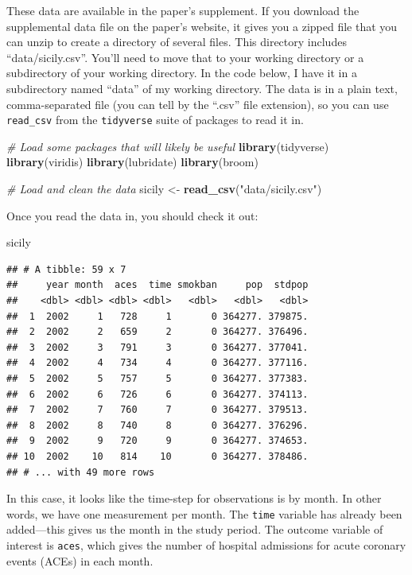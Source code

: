 \documentclass[
]{book}
\newenvironment{Shaded}{\begin{snugshade}}{\end{snugshade}}
\newcommand{\CommentTok}[1]{\textcolor[rgb]{0.56,0.35,0.01}{\textit{#1}}}
\newcommand{\KeywordTok}[1]{\textcolor[rgb]{0.13,0.29,0.53}{\textbf{#1}}}
\newcommand{\NormalTok}[1]{#1}
\newcommand{\StringTok}[1]{\textcolor[rgb]{0.31,0.60,0.02}{#1}}
\begin{document}
These data are available in the paper's supplement. If you download the supplemental data file on the paper's website, it gives you a zipped file that you can unzip to create a directory of several files. This directory includes ``data/sicily.csv''. You'll need to move that to your working directory or a subdirectory of your working directory. In the code below, I have it in a subdirectory named ``data'' of my working directory. The data is in a plain text, comma-separated file (you can tell by the ``.csv'' file extension), so you can use \texttt{read\_csv} from the \texttt{tidyverse} suite of packages to read it in.

\begin{Shaded}
\begin{Highlighting}[]
\CommentTok{# Load some packages that will likely be useful}
\KeywordTok{library}\NormalTok{(tidyverse)}
\KeywordTok{library}\NormalTok{(viridis)}
\KeywordTok{library}\NormalTok{(lubridate)}
\KeywordTok{library}\NormalTok{(broom)}

\CommentTok{# Load and clean the data}
\NormalTok{sicily <-}\StringTok{ }\KeywordTok{read_csv}\NormalTok{(}\StringTok{"data/sicily.csv"}\NormalTok{)}
\end{Highlighting}
\end{Shaded}

Once you read the data in, you should check it out:

\begin{Shaded}
\begin{Highlighting}[]
\NormalTok{sicily}
\end{Highlighting}
\end{Shaded}

\begin{verbatim}
## # A tibble: 59 x 7
##     year month  aces  time smokban     pop  stdpop
##    <dbl> <dbl> <dbl> <dbl>   <dbl>   <dbl>   <dbl>
##  1  2002     1   728     1       0 364277. 379875.
##  2  2002     2   659     2       0 364277. 376496.
##  3  2002     3   791     3       0 364277. 377041.
##  4  2002     4   734     4       0 364277. 377116.
##  5  2002     5   757     5       0 364277. 377383.
##  6  2002     6   726     6       0 364277. 374113.
##  7  2002     7   760     7       0 364277. 379513.
##  8  2002     8   740     8       0 364277. 376296.
##  9  2002     9   720     9       0 364277. 374653.
## 10  2002    10   814    10       0 364277. 378486.
## # ... with 49 more rows
\end{verbatim}

In this case, it looks like the time-step for observations is by month. In other words, we have one measurement per month. The \texttt{time} variable has already been added---this gives us the month in the study period. The outcome variable of interest is \texttt{aces}, which gives the number of hospital admissions for acute coronary events (ACEs) in each month.
\end{document}
